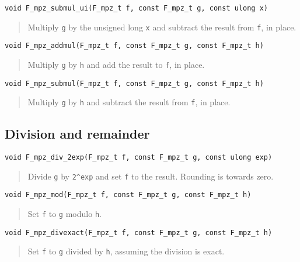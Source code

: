 \documentclass[a4paper,10pt]{article}
\newcommand{\code}{\lstinline}
\begin{document}
\begin{lstlisting}
void F_mpz_submul_ui(F_mpz_t f, const F_mpz_t g, const ulong x)
\end{lstlisting}
\begin{quote}
Multiply \code{g} by the unsigned long \code{x} and subtract the result from \code{f}, in place.
\end{quote}

\begin{lstlisting}
void F_mpz_addmul(F_mpz_t f, const F_mpz_t g, const F_mpz_t h)
\end{lstlisting}
\begin{quote}
Multiply \code{g} by \code{h} and add the result to \code{f}, in place.
\end{quote}

\begin{lstlisting}
void F_mpz_submul(F_mpz_t f, const F_mpz_t g, const F_mpz_t h)
\end{lstlisting}
\begin{quote}
Multiply \code{g} by \code{h} and subtract the result from \code{f}, in place.
\end{quote}

\subsection{Division and remainder}

\begin{lstlisting}
void F_mpz_div_2exp(F_mpz_t f, const F_mpz_t g, const ulong exp)
\end{lstlisting}
\begin{quote}
Divide \code{g} by \code{2^exp} and set \code{f} to the result. Rounding is towards zero.
\end{quote}

\begin{lstlisting}
void F_mpz_mod(F_mpz_t f, const F_mpz_t g, const F_mpz_t h)
\end{lstlisting}
\begin{quote}
Set \code{f} to \code{g} modulo \code{h}.
\end{quote}

\begin{lstlisting}
void F_mpz_divexact(F_mpz_t f, const F_mpz_t g, const F_mpz_t h)
\end{lstlisting}
\begin{quote}
Set \code{f} to \code{g} divided by \code{h}, assuming the division is exact.
\end{quote}
\end{document}
